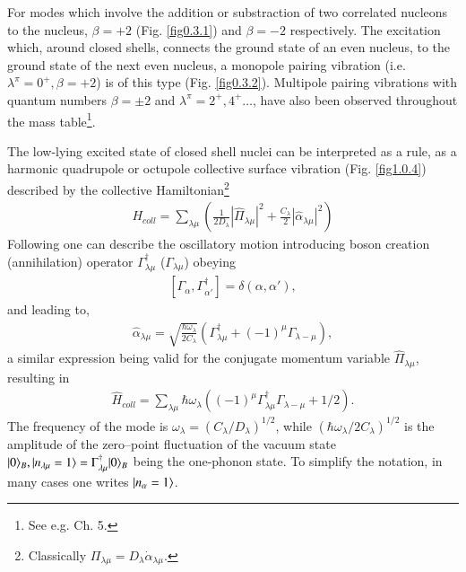 For modes which involve the addition or substraction of two correlated nucleons to the nucleus, $\beta=+2$ (Fig. \ref{fig0.3.1}) and $\beta=-2$ respectively. The excitation which, around closed shells, connects the ground state of an even nucleus, to the ground state of the next even nucleus, a monopole pairing vibration (i.e. $\lambda^\pi=0^+, \beta=+2$) is of this type (Fig. \ref{fig0.3.2}). Multipole pairing vibrations with quantum numbers $\beta=\pm 2$ and $\lambda^\pi=2^+,4^+\dots$, have also been observed throughout the mass table\footnote{See e.g. \cite{Flynn:71,Brink:05} Ch. 5.}.

The low-lying excited state of closed shell nuclei can be interpreted as a rule, as a harmonic quadrupole or octupole collective surface vibration (Fig. \ref{fig1.0.4}) described by the collective Hamiltonian\footnote{Classically $\Pi_{\lambda\mu}=D_\lambda\dot\alpha_{\lambda\mu}$.}
\begin{align}\label{eq1.0.7}
H_{coll}=\sum_{\lambda\mu}\left(\frac{1}{2D_{\lambda}}|\hat\Pi_{\lambda\mu}|^2+\frac{C_\lambda}{2}|\hat \alpha_{\lambda\mu}|^2\right)
\end{align}
Following \cite{Dirac:26} one can describe the oscillatory motion introducing boson creation (annihilation) operator $\Gamma_{\lambda\mu}^\dagger$ ($\Gamma_{\lambda\mu}$) obeying
\begin{align}\label{eq1.0.8}
\left[\Gamma_{\alpha},\Gamma_{\alpha'}^\dagger\right]=\delta(\alpha,\alpha'),
\end{align}
and leading to, 
\begin{align}\label{eq1.0.9}
\hat\alpha_{\lambda\mu}=\sqrt{\frac{\hbar\omega_\lambda}{2C_\lambda}}\left(\Gamma_{\lambda\mu}^\dagger+(-1)^\mu\Gamma_{\lambda-\mu}\right),
\end{align}
 a similar expression being valid for the conjugate momentum variable $\hat\Pi_{\lambda\mu}$, resulting in 
\begin{align}\label{eq1.0.9b}
\hat H_{coll}=\sum_{\lambda\mu}\hbar\omega_\lambda\left((-1)^\mu\Gamma_{\lambda\mu}^\dagger\Gamma_{\lambda-\mu}+1/2\right).
\end{align}
The frequency of the mode is $\omega_\lambda=(C_\lambda/D_\lambda)^{1/2}$, while $(\hbar\omega_\lambda/2C_\lambda)^{1/2}$ is the amplitude of the zero--point fluctuation of the vacuum state $|{0} \rangle_B,|{n_{\lambda\mu}=1} \rangle=\Gamma_{\lambda\mu}^\dagger |{0} \rangle_B$ being the one-phonon state. To simplify the notation, in many cases one writes $|{n_\alpha=1} \rangle$.
